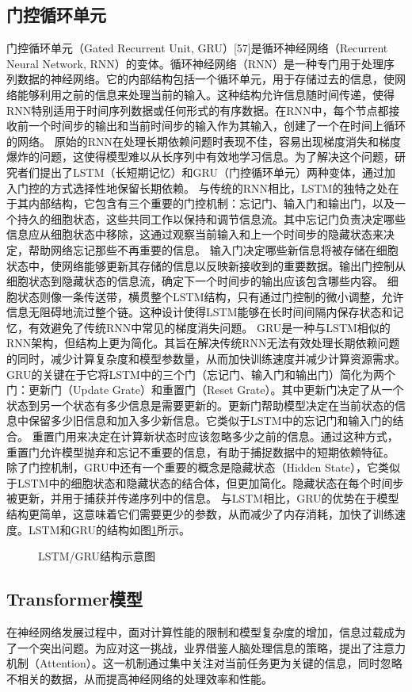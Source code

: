 \subsection{门控循环单元}
门控循环单元（Gated Recurrent Unit, GRU）[57]是循环神经网络（Recurrent Neural
Network, RNN）的变体。循环神经网络（RNN）是一种专门用于处理序列数据的神经网络。它的内部结构包括一个循环单元，用于存储过去的信息，使网络能够利用之前的信息来处理当前的输入。这种结构允许信息随时间传递，使得RNN特别适用于时间序列数据或任何形式的有序数据。在RNN中，每个节点都接收前一个时间步的输出和当前时间步的输入作为其输入，创建了一个在时间上循环的网络。
原始的RNN在处理长期依赖问题时表现不佳，容易出现梯度消失和梯度爆炸的问题，这使得模型难以从长序列中有效地学习信息。为了解决这个问题，研究者们提出了LSTM（长短期记忆）和GRU（门控循环单元）两种变体，通过加入门控的方式选择性地保留长期依赖。
与传统的RNN相比，LSTM的独特之处在于其内部结构，它包含有三个重要的门控机制：忘记门、输入门和输出门，以及一个持久的细胞状态，这些共同工作以保持和调节信息流。其中忘记门负责决定哪些信息应从细胞状态中移除，这通过观察当前输入和上一个时间步的隐藏状态来决定，帮助网络忘记那些不再重要的信息。
输入门决定哪些新信息将被存储在细胞状态中，使网络能够更新其存储的信息以反映新接收到的重要数据。输出门控制从细胞状态到隐藏状态的信息流，确定下一个时间步的输出应该包含哪些内容。
细胞状态则像一条传送带，横贯整个LSTM结构，只有通过门控制的微小调整，允许信息无阻碍地流过整个链。这种设计使得LSTM能够在长时间间隔内保存状态和记忆，有效避免了传统RNN中常见的梯度消失问题。
GRU是一种与LSTM相似的RNN架构，但结构上更为简化。其旨在解决传统RNN无法有效处理长期依赖问题的同时，减少计算复杂度和模型参数量，从而加快训练速度并减少计算资源需求。
GRU的关键在于它将LSTM中的三个门（忘记门、输入门和输出门）简化为两个门：更新门（Update Grate）和重置门（Reset Grate）。其中更新门决定了从一个状态到另一个状态有多少信息是需要更新的。更新门帮助模型决定在当前状态的信息中保留多少旧信息和加入多少新信息。它类似于LSTM中的忘记门和输入门的结合。
重置门用来决定在计算新状态时应该忽略多少之前的信息。通过这种方式，重置门允许模型抛弃和忘记不重要的信息，有助于捕捉数据中的短期依赖特征。
除了门控机制，GRU中还有一个重要的概念是隐藏状态（Hidden State），它类似于LSTM中的细胞状态和隐藏状态的结合体，但更加简化。隐藏状态在每个时间步被更新，并用于捕获并传递序列中的信息。
与LSTM相比，GRU的优势在于模型结构更简单，这意味着它们需要更少的参数，从而减少了内存消耗，加快了训练速度。LSTM和GRU的结构如图\ref{fig:lstmandgru}所示。
\begin{figure}[H]
    \centering
    \caption{LSTM/GRU结构示意图}
    \label{fig:lstmandgru}
\end{figure}
\subsection{Transformer模型}
在神经网络发展过程中，面对计算性能的限制和模型复杂度的增加，信息过载成为了一个突出问题。为应对这一挑战，业界借鉴人脑处理信息的策略，提出了注意力机制（Attention）。这一机制通过集中关注对当前任务更为关键的信息，同时忽略不相关的数据，从而提高神经网络的处理效率和性能。

